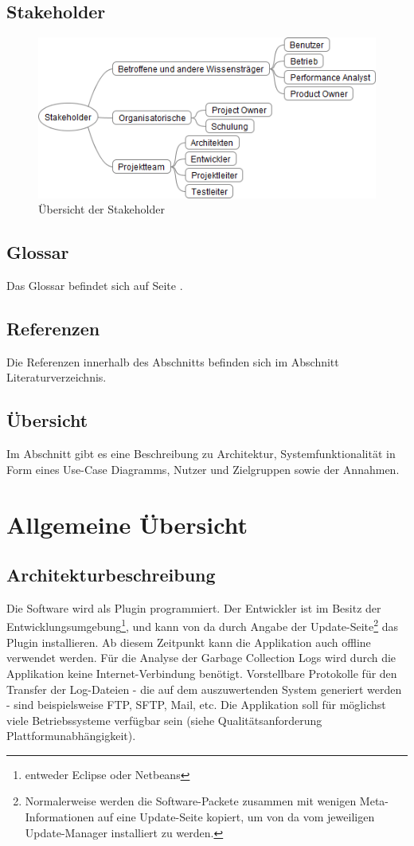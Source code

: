 \subsection{Stakeholder}
 \begin{figure}[H]
        	\caption{Übersicht der Stakeholder}
  	\centering
    	\includegraphics[width=15cm]{images/stakeholder_analyse}
\end{figure}

\subsection{Glossar}
Das Glossar befindet sich auf Seite \pageref{glossar}. 
\subsection{Referenzen}
Die Referenzen innerhalb des Abschnitts  befinden sich im Abschnitt Literaturverzeichnis.
\subsection{Übersicht}
Im Abschnitt  gibt es eine Beschreibung zu Architektur, Systemfunktionalität in Form eines Use-Case Diagramms, Nutzer und Zielgruppen sowie der Annahmen. 

\section{Allgemeine Übersicht}\label{allgemeine_uebersicht}
\subsection{Architekturbeschreibung}
Die Software wird als Plugin programmiert. Der Entwickler ist im Besitz der Entwicklungsumgebung\footnote{entweder Eclipse oder Netbeans}, und kann von da durch Angabe der Update-Seite\footnote{Normalerweise werden die Software-Packete zusammen mit wenigen Meta-Informationen auf eine Update-Seite kopiert, um von da vom jeweiligen Update-Manager installiert zu werden.} das Plugin installieren. Ab diesem Zeitpunkt kann die Applikation auch offline verwendet werden. Für die Analyse der Garbage Collection Logs wird durch die Applikation keine Internet-Verbindung benötigt. Vorstellbare Protokolle für den Transfer der Log-Dateien - die auf dem auszuwertenden System generiert werden - sind beispielsweise FTP, SFTP, Mail, etc. Die Applikation soll für möglichst viele Betriebssysteme verfügbar sein (siehe Qualitätsanforderung Plattformunabhängigkeit).
